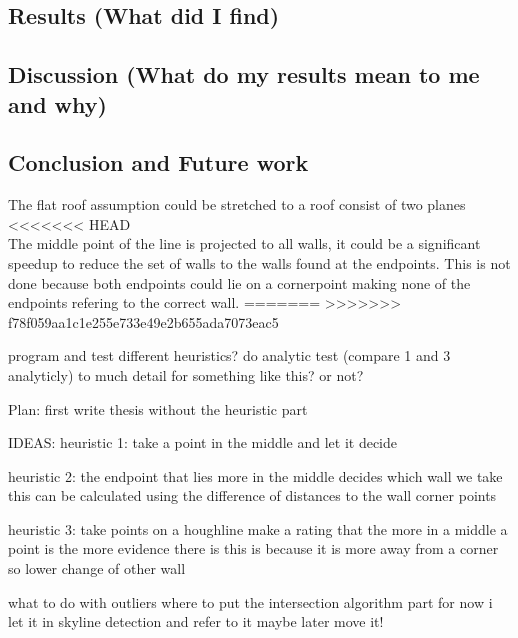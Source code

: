 \subsection{Results (What did I find)}
\subsection{Discussion (What do my results mean to me and why)}
\subsection{Conclusion and Future work}
The flat roof assumption could be stretched to a roof consist of two planes
<<<<<<< HEAD
\\
The middle point of the line is projected to all walls, it could be a significant speedup to reduce the set of walls to the walls found at the endpoints. This is not done because both endpoints could lie on a cornerpoint making none of the endpoints refering to the correct wall.
=======
>>>>>>> f78f059aa1c1e255e733e49e2b655ada7073eac5


program and test different heuristics?
do analytic test (compare 1 and 3 analyticly)
	to much detail for something like this? or not?

Plan:
first write thesis without the heuristic part

IDEAS:
heuristic 1:
take a point in the middle and let it decide

heuristic 2:
the endpoint that lies more in the middle decides which wall we take
this can be calculated using the difference of distances to the wall corner points

heuristic 3:
take points on a houghline
make a rating that the more in a middle a point is the more evidence there is
this is because it is more away from a corner so lower change of other wall


what to do with outliers
where to put the intersection algorithm part
for now i let it in skyline detection and refer to it
maybe later move it!



